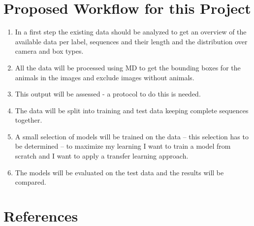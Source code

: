 \documentclass{article}
\begin{document}
\section*{Proposed Workflow for this Project}

\begin{enumerate}
  \item In a first step the existing data should be analyzed to get an overview of the available data per label, sequences and their length and the distribution over camera and box types.
  \item All the data will be processed using MD to get the bounding boxes for the animals in the images and exclude images without animals.
  \item This output will be assessed - a protocol to do this is needed.
  \item The data will be split into training and test data keeping complete sequences together.
  \item A small selection of models will be trained on the data -- this selection has to be determined -- to maximize my learning I want to train a model from scratch and I
  want to apply a transfer learning approach.
  \item The models will be evaluated on the test data and the results will be compared.
\end{enumerate}

\section*{References}

\printbibliography[heading=none]
\end{document}
